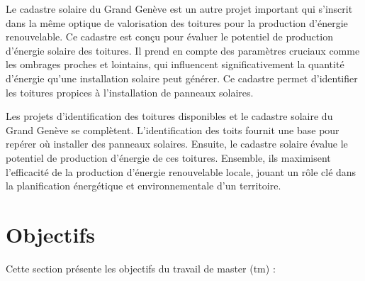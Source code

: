 \par{Le cadastre solaire du Grand Genève est un autre projet important qui s'inscrit dans la même optique de valorisation des toitures pour la production d'énergie renouvelable. Ce cadastre est conçu pour évaluer le potentiel de production d'énergie solaire des toitures. Il prend en compte des paramètres cruciaux comme les ombrages proches et lointains, qui influencent significativement la quantité d'énergie qu'une installation solaire peut générer. Ce cadastre permet d’identifier les toitures propices à l’installation de panneaux solaires.}
\par{Les projets d'identification des toitures disponibles et le cadastre solaire du Grand Genève se complètent. L'identification des toits fournit une base pour repérer où installer des panneaux solaires. Ensuite, le cadastre solaire évalue le potentiel de production d'énergie de ces toitures. Ensemble, ils maximisent l'efficacité de la production d'énergie renouvelable locale, jouant un rôle clé dans la planification énergétique et environnementale d'un territoire.}

\section{Objectifs}
Cette section présente les objectifs du travail de master (\acrshort{tm}) :

